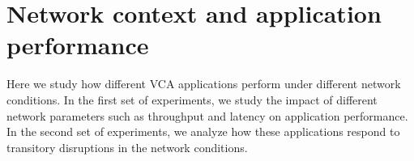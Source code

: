 \section{Network context and application performance}\label{sec:methodology}
Here we study how different VCA applications perform under different network conditions. In the first set of experiments, we study the impact of different network parameters such as throughput and latency on application performance. In the second set of experiments, we analyze how these applications respond to transitory disruptions in the network conditions. 

